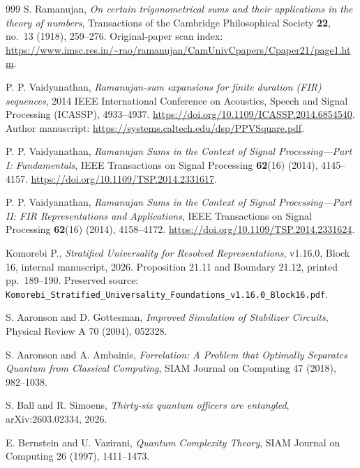 \begin{thebibliography}{999}
S. Ramanujan,
\emph{On certain trigonometrical sums and their applications in the theory of numbers},
Transactions of the Cambridge Philosophical Society \textbf{22}, no.~13 (1918), 259--276.
Original-paper scan index: \url{https://www.imsc.res.in/~rao/ramanujan/CamUnivCpapers/Cpaper21/page1.htm}.


P. P. Vaidyanathan,
\emph{Ramanujan-sum expansions for finite duration (FIR) sequences},
2014 IEEE International Conference on Acoustics, Speech and Signal Processing (ICASSP), 4933--4937.
\url{https://doi.org/10.1109/ICASSP.2014.6854540}.
Author manuscript: \url{https://systems.caltech.edu/dsp/PPVSquare.pdf}.


P. P. Vaidyanathan,
\emph{Ramanujan Sums in the Context of Signal Processing---Part I: Fundamentals},
IEEE Transactions on Signal Processing \textbf{62}(16) (2014), 4145--4157.
\url{https://doi.org/10.1109/TSP.2014.2331617}.


P. P. Vaidyanathan,
\emph{Ramanujan Sums in the Context of Signal Processing---Part II: FIR Representations and Applications},
IEEE Transactions on Signal Processing \textbf{62}(16) (2014), 4158--4172.
\url{https://doi.org/10.1109/TSP.2014.2331624}.

Komorebi P.,
\emph{Stratified Universality for Resolved Representations},
v1.16.0, Block 16, internal manuscript, 2026.
Proposition 21.11 and Boundary 21.12, printed pp.~189--190.
Preserved source: \texttt{Komorebi\_Stratified\_Universality\_Foundations\_v1.16.0\_Block16.pdf}.




S. Aaronson and D. Gottesman,
\emph{Improved Simulation of Stabilizer Circuits},
Physical Review A 70 (2004), 052328.


S. Aaronson and A. Ambainis,
\emph{Forrelation: A Problem that Optimally Separates Quantum from Classical Computing},
SIAM Journal on Computing 47 (2018), 982--1038.


S. Ball and R. Simoens,
\emph{Thirty-six quantum officers are entangled},
arXiv:2603.02334, 2026.


E. Bernstein and U. Vazirani,
\emph{Quantum Complexity Theory},
SIAM Journal on Computing 26 (1997), 1411--1473.



\end{thebibliography}
